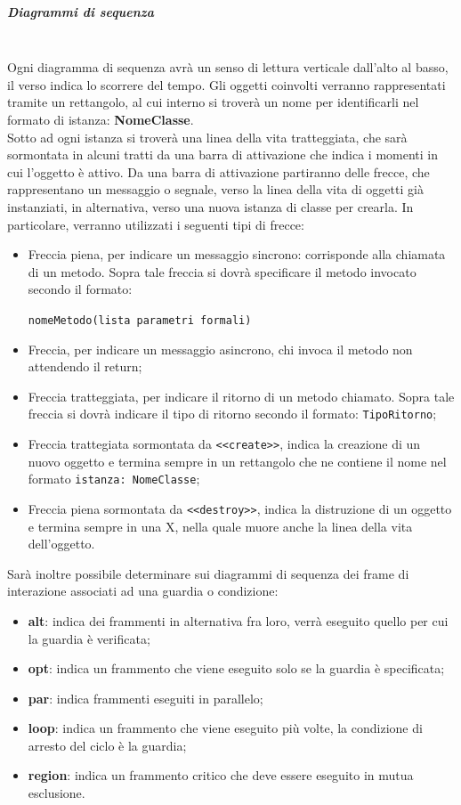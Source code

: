 \subparagraph{Diagrammi di sequenza}\mbox{}\\
Ogni diagramma di sequenza avrà un senso di lettura verticale dall’alto al basso, il verso indica lo scorrere del tempo.  Gli oggetti coinvolti verranno rappresentati tramite un rettangolo, al cui interno si troverà un nome per identificarli nel formato di istanza: \textbf{NomeClasse}.\\ Sotto ad ogni istanza si troverà una linea della vita tratteggiata, che sarà sormontata in alcuni tratti da una barra di attivazione che indica i momenti in cui l’oggetto è attivo.  Da una barra di attivazione partiranno delle frecce, che rappresentano un messaggio o segnale, verso la linea della vita di oggetti già instanziati, in alternativa, verso una nuova istanza di classe per crearla.  In particolare, verranno utilizzati i seguenti tipi di frecce:
\begin{itemize}
\item Freccia piena, per indicare un messaggio sincrono: corrisponde alla chiamata di un metodo. Sopra tale freccia si dovrà specificare il metodo invocato secondo il formato:
\begin{center}
\texttt{nomeMetodo(lista parametri formali)}
\end{center} 

\item Freccia, per indicare un messaggio asincrono, chi invoca il metodo non attendendo il return; 

\item Freccia tratteggiata, per indicare il ritorno di un metodo chiamato. Sopra tale freccia si dovrà indicare il tipo di ritorno secondo il formato: \texttt{TipoRitorno};

\item Freccia trattegiata sormontata da \texttt{<<create>>}, indica la creazione di un nuovo oggetto e termina sempre in un rettangolo che ne contiene il nome nel formato \texttt{istanza: NomeClasse};

\item Freccia piena sormontata da \texttt{<<destroy>>}, indica la distruzione di un oggetto e
termina sempre in una X, nella quale muore anche la linea della vita dell’oggetto.
\end{itemize}
Sarà inoltre possibile determinare sui diagrammi di sequenza dei frame di interazione
associati ad una guardia o condizione:
\begin{itemize}
\item \textbf{alt}: indica dei frammenti in alternativa fra loro, verrà eseguito quello per cui la
guardia è verificata;
\item \textbf{opt}: indica un frammento che viene eseguito solo se la guardia è specificata;
\item \textbf{par}: indica frammenti eseguiti in parallelo;
\item \textbf{loop}: indica un frammento che viene eseguito più volte, la condizione di arresto del
ciclo è la guardia;
\item \textbf{region}: indica un frammento critico che deve essere eseguito in mutua esclusione.
\end{itemize}

